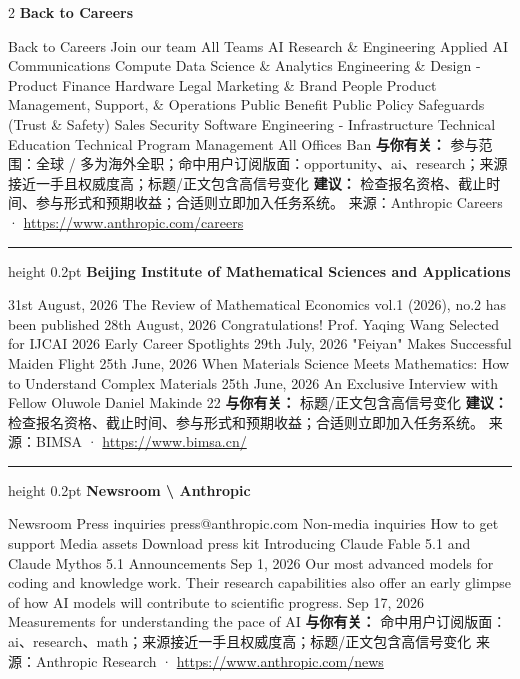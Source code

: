 \documentclass[10.5pt]{ctexart}
\begin{document}
\begin{multicols}{2}
{\large\bfseries Back to Careers}\par
Back to Careers Join our team All Teams AI Research \& Engineering Applied AI Communications Compute Data Science \& Analytics Engineering \& Design - Product Finance Hardware Legal Marketing \& Brand People Product Management, Support, \& Operations Public Benefit Public Policy Safeguards (Trust \& Safety) Sales Security Software Engineering - Infrastructure Technical Education Technical Program Management All Offices Ban
\textbf{与你有关：} 参与范围：全球 / 多为海外全职；命中用户订阅版面：opportunity、ai、research；来源接近一手且权威度高；标题/正文包含高信号变化
\textbf{建议：} 检查报名资格、截止时间、参与形式和预期收益；合适则立即加入任务系统。
{\footnotesize\color{ormuted} 来源：Anthropic Careers · \url{https://www.anthropic.com/careers}}
\vspace{2mm}
\hrule height 0.2pt
\vspace{2mm}
{\large\bfseries Beijing Institute of Mathematical Sciences and Applications}\par
31st August, 2026 The Review of Mathematical Economics vol.1 (2026), no.2 has been published 28th August, 2026 Congratulations! Prof. Yaqing Wang Selected for IJCAI 2026 Early Career Spotlights 29th July, 2026 "Feiyan" Makes Successful Maiden Flight 25th June, 2026 When Materials Science Meets Mathematics: How to Understand Complex Materials 25th June, 2026 An Exclusive Interview with Fellow Oluwole Daniel Makinde 22
\textbf{与你有关：} 标题/正文包含高信号变化
\textbf{建议：} 检查报名资格、截止时间、参与形式和预期收益；合适则立即加入任务系统。
{\footnotesize\color{ormuted} 来源：BIMSA · \url{https://www.bimsa.cn/}}
\vspace{2mm}
\hrule height 0.2pt
\vspace{2mm}
{\large\bfseries Newsroom \textbackslash{} Anthropic}\par
Newsroom Press inquiries press@anthropic.com Non-media inquiries How to get support Media assets Download press kit Introducing Claude Fable 5.1 and Claude Mythos 5.1 Announcements Sep 1, 2026 Our most advanced models for coding and knowledge work. Their research capabilities also offer an early glimpse of how AI models will contribute to scientific progress. Sep 17, 2026 Measurements for understanding the pace of AI
\textbf{与你有关：} 命中用户订阅版面：ai、research、math；来源接近一手且权威度高；标题/正文包含高信号变化
{\footnotesize\color{ormuted} 来源：Anthropic Research · \url{https://www.anthropic.com/news}}

\end{multicols}
\end{document}
